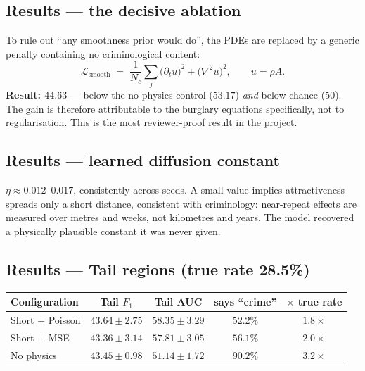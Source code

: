 \documentclass[11pt,a4paper]{article}
\begin{document}
\subsection{Results --- the decisive ablation}
To rule out ``any smoothness prior would do'', the PDEs are replaced by a
generic penalty containing no criminological content:
\begin{equation}
\mathcal{L}_{\mathrm{smooth}} \;=\; \frac{1}{N_c}\sum_j \big(\partial_t u\big)^2 + \big(\nabla^2 u\big)^2, \qquad u = \rho A .
\end{equation}
\noindent \textbf{Result: $\mathbf{44.63}$} --- below the no-physics control
($53.17$) \emph{and} below chance ($50$). The gain is therefore attributable to
the burglary equations specifically, not to regularisation. This is the most
reviewer-proof result in the project.

\subsection{Results --- learned diffusion constant}
$\eta \approx 0.012$--$0.017$, consistently across seeds. A small value implies
attractiveness spreads only a short distance, consistent with criminology:
near-repeat effects are measured over metres and weeks, not kilometres and
years. The model recovered a physically plausible constant it was never given.

\subsection{Results --- Tail regions (true rate 28.5\%)}
\begin{center}
\begin{tabular}{lcccc}
\toprule
Configuration & Tail $F_1$ & Tail AUC & says ``crime'' & $\times$ true rate \\
\midrule
Short + Poisson & $43.64\pm2.75$ & $\mathbf{58.35\pm3.29}$ & $52.2\%$ & $\mathbf{1.8\times}$ \\
Short + MSE & $43.36\pm3.14$ & $57.81\pm3.05$ & $56.1\%$ & $2.0\times$ \\
No physics & $43.45\pm0.98$ & $51.14\pm1.72$ & $90.2\%$ & $3.2\times$ \\
\bottomrule
\end{tabular}
\end{center}
\end{document}
